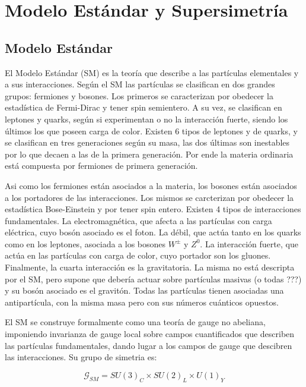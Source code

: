 \chapter{Modelo Estándar y Supersimetría}


\section{Modelo Estándar}

El Modelo Estándar (SM) es la teoría que describe a las partículas elementales y a sus interacciones. Según el SM las partículas se clasifican en dos grandes grupos: fermiones y bosones. Los primeros se caracterizan por obedecer la estadística de Fermi-Dirac y tener spin semientero. A su vez, se clasifican en leptones y quarks, según si experimentan o no la interacción fuerte, siendo los últimos los que poseen carga de color.  Existen 6 tipos de leptones y de quarks, y se clasifican en tres generaciones según su masa, las dos últimas son inestables por lo que decaen a las de la primera generación. Por ende la materia ordinaria está compuesta por fermiones de primera generación. 

Asi como los fermiones están asociados a la materia, los bosones están asociados a los portadores de las interacciones. Los mismos se carcterizan por obedecer la estadística Bose-Einstein y por tener spin entero. Existen 4 tipos de interacciones fundamentales. La electromagnética, que afecta a las partículas con carga eléctrica, cuyo bosón asociado es el foton. La débil, que actúa tanto en los quarks como en los leptones, asociada a los bosones $W^{\pm}$ y $Z^{0}$. La interacción fuerte, que actúa en las partículas con carga de color, cuyo portador son los gluones. Finalmente, la cuarta interacción es la gravitatoria. La misma no está descripta por el SM, pero supone que debería actuar sobre partículas masivas (o todas ???) y su bosón asociado es el gravitón. Todas las partículas tienen asociadas una antipartícula, con la misma masa pero con sus números cuánticos opuestos. 

El SM se construye formalmente como una teoría de gauge no abeliana, imponiendo invarianza de gauge local sobre campos cuantificados que describen las partículas fundamentales, dando lugar a los campos de gauge que descibren las interacciones. Su grupo de simetria es:

\begin{equation}
\mathcal{G}_{SM}=SU(3)_{C}\times SU(2)_{L}\times U(1)_{Y}
\end{equation}


